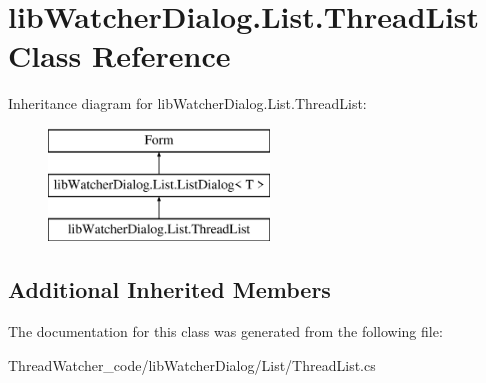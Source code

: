 \hypertarget{classlib_watcher_dialog_1_1_list_1_1_thread_list}{\section{lib\+Watcher\+Dialog.\+List.\+Thread\+List Class Reference}
\label{classlib_watcher_dialog_1_1_list_1_1_thread_list}
}
Inheritance diagram for lib\+Watcher\+Dialog.\+List.\+Thread\+List\+:\begin{figure}[H]
\begin{center}
\leavevmode
\includegraphics[height=3.000000cm]{classlib_watcher_dialog_1_1_list_1_1_thread_list}
\end{center}
\end{figure}
\subsection*{Additional Inherited Members}


The documentation for this class was generated from the following file\+:\begin{DoxyCompactItemize}
\item 
Thread\+Watcher\+\_\+code/lib\+Watcher\+Dialog/\+List/Thread\+List.\+cs\end{DoxyCompactItemize}

